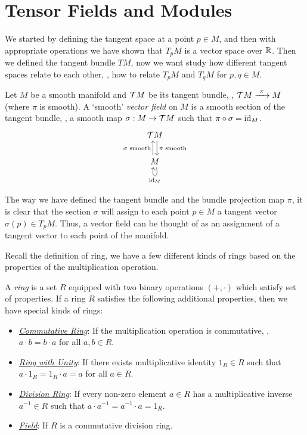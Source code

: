 
\section{Tensor Fields and Modules}

We started by defining the tangent space at a point \(p \in M\), and then with appropriate operations we have shown that \(T_p M\) is a vector space over \(\mathbb R\). Then we defined the tangent bundle \(TM\), now we want study how different tangent spaces relate to each other, \ie, how to relate \(T_p M\) and \(T_q M\) for \(p, q \in M\).
\begin{definition}
	Let \(M\) be a smooth manifold and \(\mathcal T M\) be its tangent bundle, \ie, \(\mathcal T M \xrightarrow{\ \pi\ } M\) (where \(\pi\) is smooth). A `smooth' \emph{vector field} on \(M\) is a smooth section of the tangent bundle, \ie, a smooth map \(\sigma: M \to \mathcal T M\) such that \(\pi \circ \sigma = \operatorname{id}_M\).
	\begin{equation*}
		\begin{tikzcd}
			\ST M \arrow[d, shift left, "\text{\(\pi\) smooth}"] \\
			M \arrow[u, shift left, "\text{\(\sigma\) smooth}"] \arrow[loop below, "\id_M"]
		\end{tikzcd}
	\end{equation*}
\end{definition}
The way we have defined the tangent bundle and the bundle projection map \(\pi\), it is clear that the section \(\sigma\) will assign to each point \(p \in M\) a tangent vector \(\sigma(p) \in T_p M\).
Thus, a vector field can be thought of as an assignment of a tangent vector to each point of the manifold.

Recall the definition of ring, we have a few different kinds of rings based on the properties of the multiplication operation.

A \emph{ring} is a set \(R\) equipped with two binary operations \((+, \cdot)\) which satisfy set of properties. If a ring \(R\) satisfies the following additional properties, then we have special kinds of rings:
\begin{itemize}
	\item \uline{\emph{Commutative Ring}}: If the multiplication operation is commutative, \ie, \(a \cdot b = b \cdot a\) for all \(a, b \in R\).
	\item \uline{\emph{Ring with Unity}}: If there exists multiplicative identity \(1_R \in R\) such that \(a \cdot 1_R = 1_R \cdot a = a\) for all \(a \in R\).
	\item \uline{\emph{Division Ring}}: If every non-zero element \(a \in R\) has a multiplicative inverse \(a^{-1} \in R\) such that \(a \cdot a^{-1} = a^{-1} \cdot a = 1_R\).
	\item \uline{\emph{Field}}: If \(R\) is a commutative division ring.
\end{itemize}

